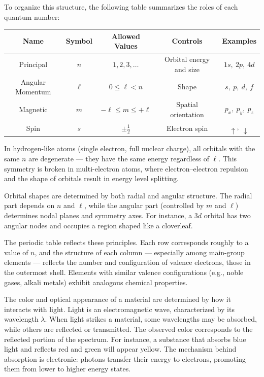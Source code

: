 \medskip

To organize this structure, the following table summarizes the roles of each quantum number:

\begin{center}
\renewcommand{\arraystretch}{1.3}
\begin{tabular}{|c|c|c|c|c|}
\hline
\textbf{Name} & \textbf{Symbol} & \textbf{Allowed Values} & \textbf{Controls} & \textbf{Examples} \\
\hline
Principal & $n$ & $1, 2, 3, \ldots$ & Orbital energy and size & $1s,\ 2p,\ 4d$ \\
Angular Momentum & $\ell$ & $0 \leq \ell < n$ & Shape & $s,\ p,\ d,\ f$ \\
Magnetic & $m$ & $-\ell \leq m \leq +\ell$ & Spatial orientation & $p_x,\ p_y,\ p_z$ \\
Spin & $s$ & $\pm \tfrac{1}{2}$ & Electron spin & $\uparrow,\ \downarrow$ \\
\hline
\end{tabular}
\end{center}

\medskip

In hydrogen-like atoms (single electron, full nuclear charge), all orbitals with the same $n$ are degenerate — they have the same energy regardless of $\ell$. This symmetry is broken in multi-electron atoms, where electron–electron repulsion and the shape of orbitals result in energy level splitting.

Orbital shapes are determined by both radial and angular structure. The radial part depends on $n$ and $\ell$, while the angular part (controlled by $m$ and $\ell$) determines nodal planes and symmetry axes. For instance, a $3d$ orbital has two angular nodes and occupies a region shaped like a cloverleaf.

\medskip

The periodic table reflects these principles. Each row corresponds roughly to a value of $n$, and the structure of each column — especially among main-group elements — reflects the number and configuration of valence electrons, those in the outermost shell. Elements with similar valence configurations (e.g., noble gases, alkali metals) exhibit analogous chemical properties.

\medskip

The color and optical appearance of a material are determined by how it interacts with light. Light is an electromagnetic wave, characterized by its wavelength \( \lambda \). When light strikes a material, some wavelengths may be absorbed, while others are reflected or transmitted. The observed color corresponds to the reflected portion of the spectrum. For instance, a substance that absorbs blue light and reflects red and green will appear yellow. The mechanism behind absorption is electronic: photons transfer their energy to electrons, promoting them from lower to higher energy states.

